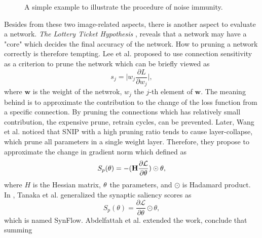 \documentclass[sigconf]{acmart}
\begin{document}
    \begin{figure*}[tb]
        \vspace{-\baselineskip}
        \caption{A simple example to illustrate the procedure of noise immunity.}
        \label{fig:ni}
        \centering
        \vspace{-\baselineskip}
    \end{figure*}

    Besides from these two image-related aspects, there is another aspect to evaluate  
    a network. 
    \textit{The Lottery Ticket Hypothesis} \cite{frankle2019lottery}, reveals that a 
    network may have a "core" which decides the final accuracy of the network. 
    How to pruning a network correctly is therefore tempting. Lee et al. 
    \cite{lee2019snip} proposed to use connection sensitivity as a criterion to prune 
    the network which can be briefly viewed as 
    \begin{equation}
        \label{equ:snip_connection_sensitivity}
        s_j=\lvert w_j\frac{\partial L}{\partial w_j}\rvert,
    \end{equation}
    where $\textbf{w}$ is the weight of the netwrok, $w_j$ the $j$-th element of 
    $\textbf{w}$. The meaning behind is to approximate the contribution 
    to the change of the loss function from a specific connection. By pruning the 
    connections which has relatively small contribution, the expensive prune, retrain 
    cycles, can be prevented. 
    Later, Wang et al. \cite{wang2020picking} noticed that SNIP with a high pruning ratio 
    tends to cause layer-collapse, which prune all parameters in a single weight layer. 
    Therefore, they propose to approximate the change in gradient norm which defined as 
    \begin{equation}
        \label{equ:grap}
        S_p(\bf{\theta})=-(H\frac{\partial \mathcal L}{\partial \bf{\theta}})\odot\bf{\theta},
    \end{equation}
    where $H$ is the Hessian matrix, $\bf{\theta}$ the parameters, and $\odot$ is Hadamard product. 
    In \cite{tanaka2020pruning}, Tanaka et al. generalized the synaptic saliency scores as 
    \begin{equation}
        \label{equ:synflow}
        S_p(\theta)=\frac{\partial \mathcal L}{\partial \theta}\odot\theta,
    \end{equation}
    which is named SynFlow. 
    Abdelfattah et al. \cite{abdelfattah2021zerocost} extended the work, conclude that summing 
\end{document}
